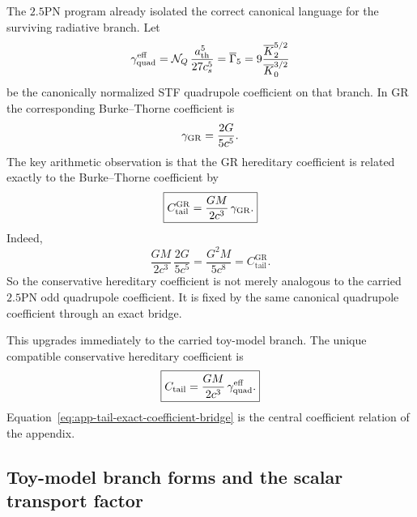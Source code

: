 \documentclass[11pt]{article}
\begin{document}
The $2.5$PN program already isolated the correct canonical language for the
surviving radiative branch.  Let
\begin{equation}
\gamma_{\rm quad}^{\rm eff}
=
\mathcal N_Q\,\frac{a_{\rm th}^5}{27c_s^5}
=
\overline\Gamma_5
=
9\frac{\overline K_2^{5/2}}{\overline K_0^{3/2}}
\label{eq:app-tail-carried-gamma}
\end{equation}
be the canonically normalized STF quadrupole coefficient on that branch.  In
GR the corresponding Burke--Thorne coefficient is
\begin{equation}
\gamma_{\rm GR}
=
\frac{2G}{5c^5}.
\label{eq:app-tail-burke-thorne}
\end{equation}
The key arithmetic observation is that the GR hereditary coefficient is related
exactly to the Burke--Thorne coefficient by
\begin{equation}
\boxed{
C_{\mathrm{tail}}^{\mathrm{GR}}
=
\frac{GM}{2c^3}\,\gamma_{\rm GR}.
}
\label{eq:app-tail-gr-bridge}
\end{equation}
Indeed,
\[
\frac{GM}{2c^3}\,\frac{2G}{5c^5}
=
\frac{G^2M}{5c^8}
=
C_{\mathrm{tail}}^{\mathrm{GR}}.
\]
So the conservative hereditary coefficient is not merely analogous to the
carried $2.5$PN odd quadrupole coefficient.  It is fixed by the same canonical
quadrupole coefficient through an exact bridge.

This upgrades immediately to the carried toy-model branch.  The unique
compatible conservative hereditary coefficient is
\begin{equation}
\boxed{
C_{\mathrm{tail}}
=
\frac{GM}{2c^3}\,\gamma_{\rm quad}^{\rm eff}.
}
\label{eq:app-tail-exact-coefficient-bridge}
\end{equation}
Equation~\eqref{eq:app-tail-exact-coefficient-bridge} is the central
coefficient relation of the appendix.

\subsection{Toy-model branch forms and the scalar transport factor}
\label{app:tail-toy-branch-form}
\end{document}
